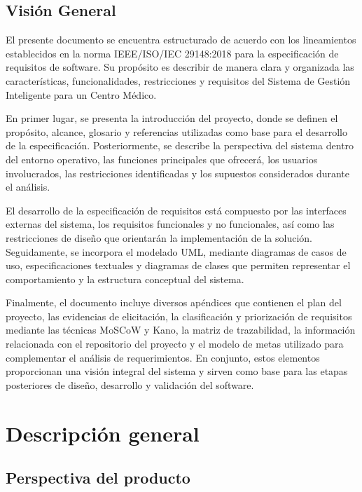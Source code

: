 \documentclass[11pt,a4paper]{article}
\begin{document}
	\subsection{ Visión General}
	
	El presente documento se encuentra estructurado de acuerdo con los lineamientos establecidos en la norma IEEE/ISO/IEC 29148:2018 para la especificación de requisitos de software. Su propósito es describir de manera clara y organizada las características, funcionalidades, restricciones y requisitos del Sistema de Gestión Inteligente para un Centro Médico.
	
	En primer lugar, se presenta la introducción del proyecto, donde se definen el propósito, alcance, glosario y referencias utilizadas como base para el desarrollo de la especificación. Posteriormente, se describe la perspectiva del sistema dentro del entorno operativo, las funciones principales que ofrecerá, los usuarios involucrados, las restricciones identificadas y los supuestos considerados durante el análisis.
	
	El desarrollo de la especificación de requisitos está compuesto por las interfaces externas del sistema, los requisitos funcionales y no funcionales, así como las restricciones de diseño que orientarán la implementación de la solución. Seguidamente, se incorpora el modelado UML, mediante diagramas de casos de uso, especificaciones textuales y diagramas de clases que permiten representar el comportamiento y la estructura conceptual del sistema.
	
	Finalmente, el documento incluye diversos apéndices que contienen el plan del proyecto, las evidencias de elicitación, la clasificación y priorización de requisitos mediante las técnicas MoSCoW y Kano, la matriz de trazabilidad, la información relacionada con el repositorio del proyecto y el modelo de metas utilizado para complementar el análisis de requerimientos. En conjunto, estos elementos proporcionan una visión integral del sistema y sirven como base para las etapas posteriores de diseño, desarrollo y validación del software.
	
	
	
	\section{ Descripción general}
	
	\subsection{ Perspectiva del producto}
	
\end{document}
